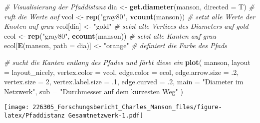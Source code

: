 \documentclass[
]{article}
\newenvironment{Shaded}{\begin{snugshade}}{\end{snugshade}}
\newcommand{\CommentTok}[1]{\textcolor[rgb]{0.56,0.35,0.01}{\textit{#1}}}
\newcommand{\DataTypeTok}[1]{\textcolor[rgb]{0.13,0.29,0.53}{#1}}
\newcommand{\DecValTok}[1]{\textcolor[rgb]{0.00,0.00,0.81}{#1}}
\newcommand{\FloatTok}[1]{\textcolor[rgb]{0.00,0.00,0.81}{#1}}
\newcommand{\KeywordTok}[1]{\textcolor[rgb]{0.13,0.29,0.53}{\textbf{#1}}}
\newcommand{\NormalTok}[1]{#1}
\newcommand{\StringTok}[1]{\textcolor[rgb]{0.31,0.60,0.02}{#1}}
\begin{document}
\begin{Shaded}
\begin{Highlighting}[]
\CommentTok{# Visualisierung der Pfaddistanz}
\NormalTok{dia <-}\StringTok{ }\KeywordTok{get.diameter}\NormalTok{(manson, }\DataTypeTok{directed =}\NormalTok{ T) }\CommentTok{# ruft die Werte auf}
\NormalTok{vcol <-}
\StringTok{  }\KeywordTok{rep}\NormalTok{(}\StringTok{"gray80"}\NormalTok{, }\KeywordTok{vcount}\NormalTok{(manson)) }\CommentTok{# setzt alle Werte der Knoten auf grau}
\NormalTok{vcol[dia] <-}\StringTok{ "gold"} \CommentTok{# setzt alle Vertices des Diameters auf gold}
\NormalTok{ecol <-}\StringTok{ }\KeywordTok{rep}\NormalTok{(}\StringTok{"gray80"}\NormalTok{, }\KeywordTok{ecount}\NormalTok{(manson)) }\CommentTok{# setzt alle Kanten auf grau}
\NormalTok{ecol[}\KeywordTok{E}\NormalTok{(manson, }\DataTypeTok{path =}\NormalTok{ dia)] <-}
\StringTok{  "orange"} \CommentTok{# definiert die Farbe des Pfads}

\CommentTok{# sucht die Kanten entlang des Pfades und färbt diese ein}
\KeywordTok{plot}\NormalTok{(}
\NormalTok{  manson,}
  \DataTypeTok{layout =}\NormalTok{ layout_nicely,}
  \DataTypeTok{vertex.color =}\NormalTok{ vcol,}
  \DataTypeTok{edge.color =}\NormalTok{ ecol,}
  \DataTypeTok{edge.arrow.size =} \FloatTok{.2}\NormalTok{,}
  \DataTypeTok{vertex.size =} \DecValTok{2}\NormalTok{,}
  \DataTypeTok{vertex.label.size =} \FloatTok{.1}\NormalTok{,}
  \DataTypeTok{edge.curved =} \FloatTok{.2}\NormalTok{,}
  \DataTypeTok{main =} \StringTok{"Diameter im Netzwerk"}\NormalTok{,}
  \DataTypeTok{sub =} \StringTok{"Durchmesser auf dem kürzesten Weg"}
\NormalTok{)}
\end{Highlighting}
\end{Shaded}

\texttt{[image: 226305\_Forschungsbericht\_Charles\_Manson\_files/figure-latex/Pfaddistanz Gesamtnetzwerk-1.pdf]}
\end{document}
